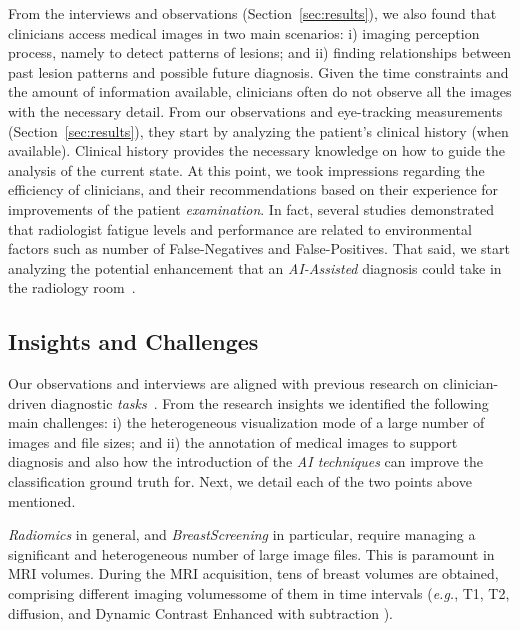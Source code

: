 From the interviews and observations (Section~\ref{sec:results}), we also found that clinicians access medical images in two main scenarios:
i) imaging perception process, namely to detect patterns of lesions;
and ii) finding relationships between past lesion patterns and possible future diagnosis.
Given the time constraints and the amount of information available, clinicians often do not observe all the images with the necessary detail.
From our observations and eye-tracking measurements (Section~\ref{sec:results}), they start by analyzing the patient's clinical history (when available).
Clinical history provides the necessary knowledge on how to guide the analysis of the current state.
At this point, we took impressions regarding the efficiency of clinicians, and their recommendations based on their experience for improvements of the patient {\it examination}.
In fact, several studies demonstrated~\cite{waite2017tired} that radiologist fatigue levels and performance are related to environmental factors such as number of False-Negatives and False-Positives.
That said, we start analyzing the potential enhancement that an {\it AI-Assisted} diagnosis could take in the radiology room~\cite{chatelain2018evaluation, miglioretti2007radiologist}.

\subsection{Insights and Challenges}
\label{sec:Challenges-Opportunities}

Our observations and interviews are aligned with previous research on clinician-driven diagnostic {\it tasks}~\cite{heinrich2012mind, rosset2004osirix, Sultanum:2018:MTP:3173574.3173996, weese2016four, wolf2005medical}.
From the research insights we identified the following main challenges:
i) the heterogeneous visualization mode of a large number of images and file sizes; and
ii) the annotation of medical images to support diagnosis and also how the introduction of the {\it AI techniques} can improve the classification ground truth for.
Next, we detail each of the two points above mentioned.

{\it Radiomics} in general, and {\it BreastScreening} in particular, require managing a significant and heterogeneous number of large image files.
This is paramount in MRI volumes.
During the MRI acquisition, tens of breast volumes are obtained, comprising different imaging volumes\footnotemark[3] some of them in time intervals ({\em e.g.}, T1, T2, diffusion, and Dynamic Contrast Enhanced with subtraction \cite{sorace2018distinguishing}).

